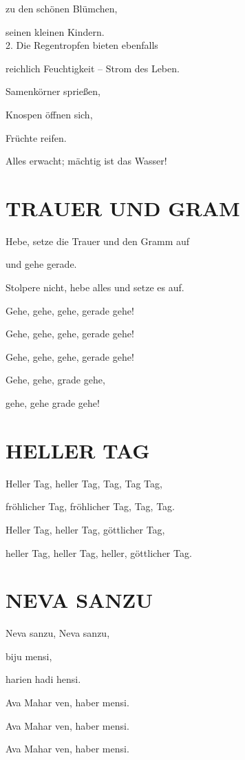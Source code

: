 \documentclass[11pt,a5paper,twoside]{article}
\begin{document}
zu den schönen Blümchen, 

seinen kleinen Kindern.\\

2.	Die Regentropfen bieten ebenfalls

 reichlich Feuchtigkeit -- Strom des Leben.
 
Samenkörner sprießen,
 
Knospen öffnen sich,
 
Früchte reifen.
 
Alles erwacht; mächtig ist das Wasser!

\section[Trauer, Gram]{TRAUER UND GRAM}

Hebe, setze die Trauer und den Gramm auf 

und gehe gerade.

Stolpere nicht, hebe alles und setze es auf.

Gehe, gehe, gehe, gerade gehe!

Gehe, gehe, gehe, gerade gehe!

Gehe, gehe, gehe, gerade gehe!

Gehe, gehe, grade gehe,

gehe, gehe grade gehe!




\section[Heller Tag]{HELLER TAG}

Heller Tag, heller Tag, Tag, Tag Tag,

fröhlicher Tag, fröhlicher Tag, Tag, Tag.

Heller Tag, heller Tag, göttlicher Tag,

heller Tag, heller Tag, heller, göttlicher Tag.

\section[Neva sanzu]{NEVA SANZU}

Neva sanzu, Neva sanzu,

biju mensi, 

harien hadi hensi.

Ava Mahar ven, haber mensi.

Ava Mahar ven, haber mensi.

Ava Mahar ven, haber mensi.
\end{document}
